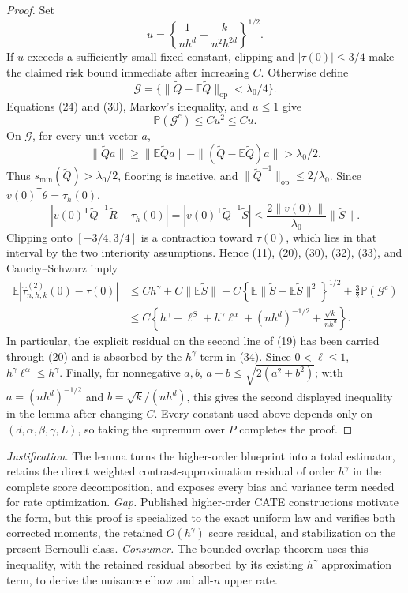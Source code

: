 \documentclass{article}
\begin{document}
\begin{proof}
Set
\[
 u=\left\{\frac1{nh^d}+\frac{k}{n^2h^{2d}}\right\}^{1/2}.
 \tag{31}
\]
If \(u\) exceeds a sufficiently small fixed constant, clipping and \(|\tau(0)|\leq3/4\) make the claimed risk bound immediate after increasing \(C\).  Otherwise define
\[
 \mathcal G=\{\|\widetilde Q-\mathbb E\widetilde Q\|_{\mathrm{op}}<\lambda_0/4\}.
\]
Equations (24) and (30), Markov's inequality, and \(u\leq1\) give
\[
 \mathbb P(\mathcal G^c)\leq Cu^2\leq Cu.
 \tag{32}
\]
On \(\mathcal G\), for every unit vector \(a\),
\[
 \|\widetilde Qa\|
 \geq\|\mathbb E\widetilde Qa\|-\|(\widetilde Q-\mathbb E\widetilde Q)a\|
 >\lambda_0/2.
\]
Thus \(s_{\min}(\widetilde Q)>\lambda_0/2\), flooring is inactive, and \(\|\widetilde Q^{-1}\|_{\mathrm{op}}\leq2/\lambda_0\).  Since \(v(0)^{\mathsf T}\theta=\tau_h(0)\),
\[
 \left|v(0)^{\mathsf T}\widetilde Q^{-1}\widetilde R-\tau_h(0)\right|
 =\left|v(0)^{\mathsf T}\widetilde Q^{-1}\widetilde S\right|
 \leq\frac{2\|v(0)\|}{\lambda_0}\|\widetilde S\|.
 \tag{33}
\]
Clipping onto \([-3/4,3/4]\) is a contraction toward \(\tau(0)\), which lies in that interval by the two interiority assumptions.  Hence (11), (20), (30), (32), (33), and Cauchy--Schwarz imply
\[
 \begin{split}
 \mathbb E\left|\widehat\tau^{(2)}_{n,h,k}(0)-\tau(0)\right|
 &\leq Ch^\gamma+C\|\mathbb E\widetilde S\|
 +C\left\{\mathbb E\|\widetilde S-\mathbb E\widetilde S\|^2\right\}^{1/2}
 +\frac32\mathbb P(\mathcal G^c)\\
 &\leq C\left\{h^\gamma+\ell^S+h^\gamma\ell^\alpha
 +(nh^d)^{-1/2}+\frac{\sqrt{k}}{nh^d}\right\}.
 \end{split}
 \tag{34}
\]
In particular, the explicit residual on the second line of (19) has been carried through (20) and is absorbed by the \(h^\gamma\) term in (34).  Since \(0<\ell\leq1\), \(h^\gamma\ell^\alpha\leq h^\gamma\).  Finally, for nonnegative \(a,b\), \(a+b\leq\sqrt{2(a^2+b^2)}\); with \(a=(nh^d)^{-1/2}\) and \(b=\sqrt{k}/(nh^d)\), this gives the second displayed inequality in the lemma after changing \(C\).  Every constant used above depends only on \((d,\alpha,\beta,\gamma,L)\), so taking the supremum over \(P\) completes the proof.
\end{proof}
\par\smallskip\noindent \textit{Justification.} The lemma turns the higher-order blueprint into a total estimator, retains the direct weighted contrast-approximation residual of order \(h^\gamma\) in the complete score decomposition, and exposes every bias and variance term needed for rate optimization. \textit{Gap.} Published higher-order CATE constructions motivate the form, but this proof is specialized to the exact uniform law and verifies both corrected moments, the retained \(O(h^\gamma)\) score residual, and stabilization on the present Bernoulli class. \textit{Consumer.} The bounded-overlap theorem uses this inequality, with the retained residual absorbed by its existing \(h^\gamma\) approximation term, to derive the nuisance elbow and all-\(n\) upper rate.
\end{document}
